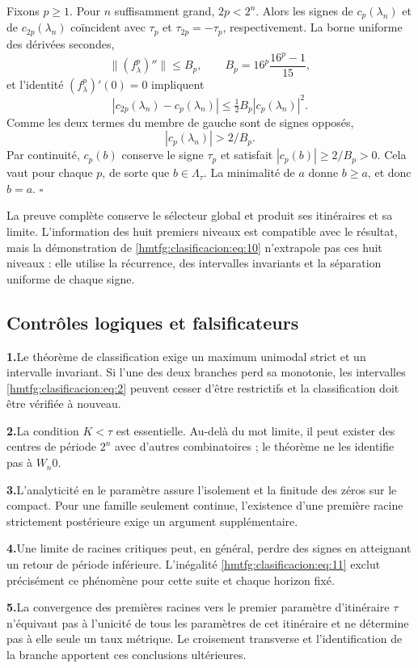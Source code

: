 Fixons \(p\ge1\). Pour \(n\) suffisamment grand, \(2p<2^n\). Alors les signes de \(c_p(\lambda_n)\) et de \(c_{2p}(\lambda_n)\) coïncident avec \(\tau_p\) et \(\tau_{2p}=-\tau_p\), respectivement. La borne uniforme des dérivées secondes,
\[
\|(f_\lambda^p)''\|\le B_p,
\qquad B_p=16^p\frac{16^p-1}{15},
\]
et l’identité \((f_\lambda^p)'(0)=0\) impliquent
\[
|c_{2p}(\lambda_n)-c_p(\lambda_n)|
\le\tfrac12B_p|c_p(\lambda_n)|^2.
\]
Comme les deux termes du membre de gauche sont de signes opposés,
\begin{equation}
|c_p(\lambda_n)|>2/B_p.
\label{hmtfg:clasificacion:eq:11}
\end{equation}
Par continuité, \(c_p(b)\) conserve le signe \(\tau_p\) et satisfait \(|c_p(b)|\ge2/B_p>0\). Cela vaut pour chaque \(p\), de sorte que \(b\in\Lambda_\tau\). La minimalité de \(a\) donne \(b\ge a\), et donc \(b=a\). \(\square\)

La preuve complète conserve le sélecteur global et produit ses itinéraires et sa limite. L’information des huit premiers niveaux est compatible avec le résultat, mais la démonstration de \eqref{hmtfg:clasificacion:eq:10} n’extrapole pas ces huit niveaux : elle utilise la récurrence, des intervalles invariants et la séparation uniforme de chaque signe.


\subsection{Contrôles logiques et falsificateurs}
\label{hmtfg:clasificacion:7}

\par\noindent\textbf{1.}\enspace Le théorème de classification exige un maximum unimodal strict et un intervalle invariant. Si l’une des deux branches perd sa monotonie, les intervalles \eqref{hmtfg:clasificacion:eq:2} peuvent cesser d’être restrictifs et la classification doit être vérifiée à nouveau.
\par\noindent\textbf{2.}\enspace La condition \(K<\tau\) est essentielle. Au-delà du mot limite, il peut exister des centres de période \(2^n\) avec d’autres combinatoires ; le théorème ne les identifie pas à \(W_n0\).
\par\noindent\textbf{3.}\enspace L’analyticité en le paramètre assure l’isolement et la finitude des zéros sur le compact. Pour une famille seulement continue, l’existence d’une première racine strictement postérieure exige un argument supplémentaire.
\par\noindent\textbf{4.}\enspace Une limite de racines critiques peut, en général, perdre des signes en atteignant un retour de période inférieure. L’inégalité \eqref{hmtfg:clasificacion:eq:11} exclut précisément ce phénomène pour cette suite et chaque horizon fixé.
\par\noindent\textbf{5.}\enspace La convergence des premières racines vers le premier paramètre d’itinéraire \(\tau\) n’équivaut pas à l’unicité de tous les paramètres de cet itinéraire et ne détermine pas à elle seule un taux métrique. Le croisement transverse et l’identification de la branche apportent ces conclusions ultérieures.
